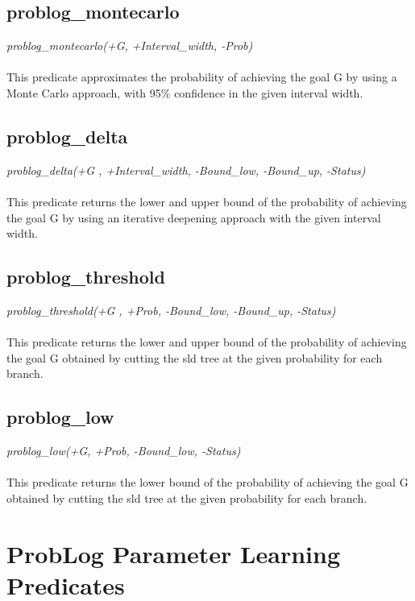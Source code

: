 \documentclass[a4paper,12pt]{article}
\begin{document}
\subsection{problog\_montecarlo}
\textit{problog\_montecarlo(+G, +Interval\_width, -Prob)}
\paragraph{}
This predicate approximates the probability of achieving the goal G by using a Monte Carlo approach, with 95\% confidence in the given interval width.

\subsection{problog\_delta}
\textit{problog\_delta(+G , +Interval\_width, -Bound\_low, -Bound\_up, -Status)}
\paragraph{}
This predicate returns the lower and upper bound of the probability of achieving the goal G by using an iterative
deepening approach with the given interval width.

\subsection{problog\_threshold}
\textit{problog\_threshold(+G , +Prob, -Bound\_low, -Bound\_up, -Status)}
\paragraph{}
This predicate returns the lower and upper bound of the probability of achieving the goal G obtained by cutting the sld tree at the given probability for each branch.

\subsection{problog\_low}
\textit{problog\_low(+G, +Prob, -Bound\_low, -Status)}
\paragraph{}
This predicate returns the lower bound of the probability of achieving the goal G obtained by cutting the sld tree at the given probability for each branch.

\section{ProbLog Parameter Learning Predicates}
\end{document}
